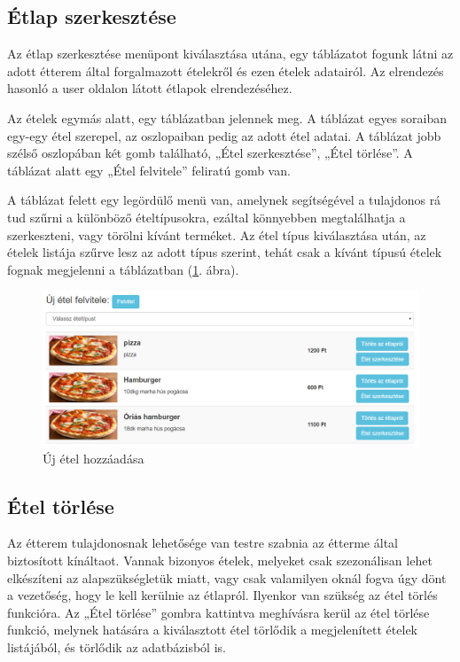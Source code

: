 \subsection{Étlap szerkesztése}

Az étlap szerkesztése menüpont kiválasztása utána, egy táblázatot fogunk látni az adott étterem által forgalmazott ételekről és ezen ételek adatairól. Az elrendezés hasonló a user oldalon látott étlapok elrendezéséhez.

Az ételek egymás alatt, egy táblázatban jelennek meg. A táblázat egyes soraiban egy-egy étel szerepel, az oszlopaiban pedig az adott étel adatai. A táblázat jobb szélső oszlopában két gomb található, „Étel szerkesztése”, „Étel törlése”. A táblázat alatt egy „Étel felvitele” feliratú gomb van.

A táblázat felett egy legördülő menü van, amelynek segítségével a tulajdonos rá tud szűrni a különböző ételtípusokra, ezáltal könnyebben megtalálhatja a szerkeszteni, vagy törölni kívánt terméket. Az étel típus kiválasztása után, az ételek listája szűrve lesz az adott típus szerint, tehát csak a kívánt típusú ételek fognak megjelenni a táblázatban (\ref{fig:new_meal}. ábra).

\begin{figure}
\centering
\includegraphics[scale=0.5]{kepek/new_meal.png}
\caption{Új étel hozzáadása}
\label{fig:new_meal}
\end{figure}

\subsection{Étel törlése}

Az étterem tulajdonosnak lehetősége van testre szabnia az étterme által biztosított kínáltaot. Vannak bizonyos ételek, melyeket csak szezonálisan lehet elkészíteni az alapszükségletük miatt, vagy csak valamilyen oknál fogva úgy dönt a vezetőség, hogy le kell kerülnie az étlapról. Ilyenkor van szükség az étel törlés funkcióra. Az „Étel törlése” gombra kattintva meghívásra kerül az étel törlése funkció, melynek hatására a kiválasztott étel törlődik a megjelenített ételek listájából, és törlődik az adatbázisból is.

